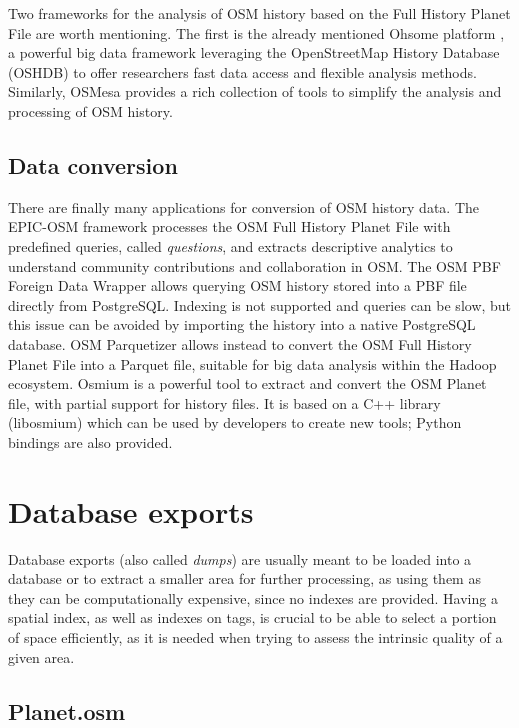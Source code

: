 \documentclass{Configuration_Files/PoliMi3i_thesis}
\begin{document}
Two frameworks for the analysis of OSM history based on the Full History Planet File are worth mentioning. The first is the already mentioned Ohsome platform \cite{OhsomeHeidelbergInstitute}, a powerful big data framework leveraging the OpenStreetMap History Database (OSHDB) \cite{raiferOSHDBFrameworkSpatiotemporal2019} to offer researchers fast data access and flexible analysis methods. Similarly, OSMesa \cite{OSMesa2022} provides a rich collection of tools to simplify the analysis and processing of OSM history.

\subsection{Data conversion}

There are finally many applications for conversion of OSM history data. The EPIC-OSM framework \cite{ProjectEPICEpicosm} processes the OSM Full History Planet File with predefined queries, called \textit{questions}, and extracts descriptive analytics to understand community contributions and collaboration in OSM. The OSM PBF Foreign Data Wrapper \cite{pikulikOSMPBFForeign2022} allows querying OSM history stored into a PBF file directly from PostgreSQL. Indexing is not supported and queries can be slow, but this issue can be avoided by importing the history into a native PostgreSQL database. OSM Parquetizer \cite{bonaAdrianulbonaOsmparquetizer2022} allows instead to convert the OSM Full History Planet File into a Parquet file, suitable for big data analysis within the Hadoop ecosystem. Osmium \cite{OsmiumCommandLine2022} is a powerful tool to extract and convert the OSM Planet file, with partial support for history files. It is based on a C++ library (libosmium) which can be used by developers to create new tools; Python bindings are also provided.

\section{Database exports}

Database exports (also called \textit{dumps}) are usually meant to be loaded into a database or to extract a smaller area for further processing, as using them as they can be computationally expensive, since no indexes are provided. Having a spatial index, as well as indexes on tags, is crucial to be able to select a portion of space efficiently, as it is needed when trying to assess the intrinsic quality of a given area.

\subsection{Planet.osm}
\end{document}
